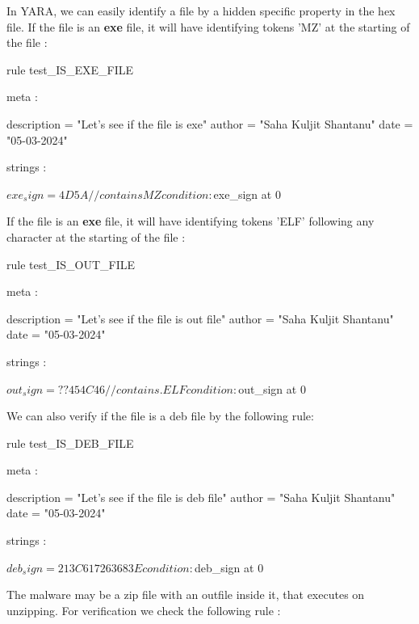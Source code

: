In YARA, we can easily identify a file by a hidden specific property in the hex file. If the file is an \textbf{exe} file, it will have identifying tokens 'MZ' at the starting of the file :



\begin{yaracode}

rule test_IS_EXE_FILE {

    meta : 

        description = "Let's see if the file is exe"
        author = "Saha Kuljit Shantanu"
        date = "05-03-2024"

    strings :

        $exe_sign = { 4D 5A } //contains MZ

    
    condition: 

        $exe_sign at 0

}

\end{yaracode}
If the file is an \textbf{exe} file, it will have identifying tokens 'ELF' following any character at the starting of the file :

\begin{yaracode}

rule test_IS_OUT_FILE {

    meta : 

        description = "Let's see if the file is out file"
        author = "Saha Kuljit Shantanu"
        date = "05-03-2024"

    strings :

        $out_sign = { ?? 45 4C 46 } //contains .ELF

    
    condition: 

        $out_sign at 0

}

\end{yaracode}
We can also verify if the file is a deb file by the following rule:

\begin{yaracode}
    
rule test_IS_DEB_FILE {

    meta : 

        description = "Let's see if the file is deb file"
        author = "Saha Kuljit Shantanu"
        date = "05-03-2024"

    strings :

        $deb_sign = { 21 3C 61 72 63 68 3E } 

    
    condition: 

        $deb_sign at 0

}

\end{yaracode}
The malware may be a zip file with an outfile inside it, that executes on unzipping. For verification we check the following rule :

